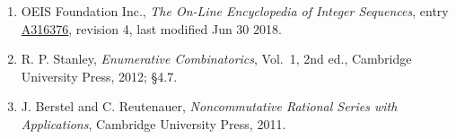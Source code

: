 \documentclass[11pt]{article}
\theoremstyle{definition}
\begin{document}
\begin{enumerate}

\item OEIS Foundation Inc., \emph{The On-Line Encyclopedia of Integer Sequences}, entry \href{https://oeis.org/A316376}{A316376}, revision 4, last modified Jun 30 2018.

\item R. P. Stanley, \emph{Enumerative Combinatorics}, Vol.~1, 2nd ed., Cambridge University Press, 2012; \S4.7.

\item J. Berstel and C. Reutenauer, \emph{Noncommutative Rational Series with Applications}, Cambridge University Press, 2011.

\end{enumerate}
\end{document}
